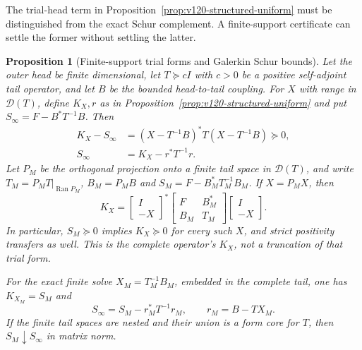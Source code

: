 \documentclass[11pt]{article}
\newtheorem{proposition}[theorem]{Proposition}
\theoremstyle{remark}
\begin{document}
The trial-head term in Proposition~\ref{prop:v120-structured-uniform}
must be distinguished from the exact Schur complement. A finite-support
certificate can settle the former without settling the latter.

\begin{proposition}[Finite-support trial forms and Galerkin Schur bounds]
\label{prop:v121-finite-trial}
Let the outer head be finite dimensional, let $T\succeq cI$ with
$c>0$ be a positive self-adjoint tail operator, and let $B$ be the
bounded head-to-tail coupling. For $X$ with range in $\mathcal D(T)$,
define $K_X,r$ as in Proposition~\ref{prop:v120-structured-uniform}
and put $S_\infty=F-B^*T^{-1}B$. Then
\begin{align}
 K_X-S_\infty
  &=(X-T^{-1}B)^*T(X-T^{-1}B)\succeq0,
       \label{eq:v121-square}\\
 S_\infty&=K_X-r^*T^{-1}r.\label{eq:v121-residual}
\end{align}
Let $P_M$ be the orthogonal projection onto a finite tail space in $\mathcal D(T)$, and
write $T_M=P_MT|_{\operatorname{Ran}P_M}$, $B_M=P_MB$ and
$S_M=F-B_M^*T_M^{-1}B_M$. If $X=P_MX$, then
\begin{equation}\label{eq:v121-finite-trial}
 K_X=\begin{bmatrix}I\\-X\end{bmatrix}^{*}
       \begin{bmatrix}F&B_M^*\\B_M&T_M\end{bmatrix}
       \begin{bmatrix}I\\-X\end{bmatrix}.
\end{equation}
In particular, $S_M\succeq0$ implies $K_X\succeq0$ for every such
$X$, and strict positivity transfers as well. This is the complete
operator's $K_X$, not a truncation of that trial form.

For the exact finite solve $X_M=T_M^{-1}B_M$, embedded in the complete
tail, one has $K_{X_M}=S_M$ and
\begin{equation}\label{eq:v121-galerkin-defect}
 \boxed{S_\infty=S_M-r_M^*T^{-1}r_M,
 \qquad r_M=B-TX_M.}
\end{equation}
If the finite tail spaces are nested and their union is a form core
for $T$, then $S_M\downarrow S_\infty$ in matrix norm.
\end{proposition}
\end{document}
